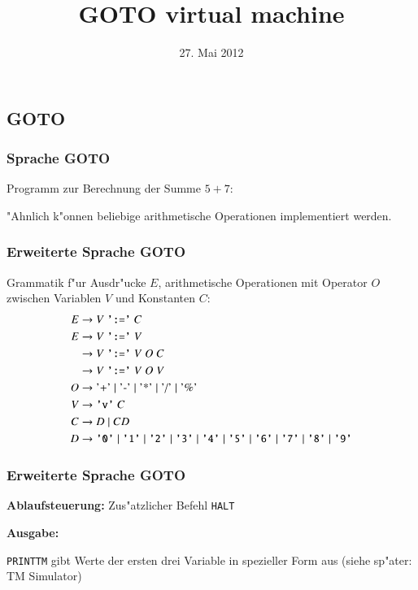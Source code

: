 \documentclass{beamer}
\title[]{GOTO virtual machine}
\date[27. Mai 2012]{27. Mai 2012}
\begin{document}
\def\blank{\text{\textvisiblespace}}

\begin{frame}
\titlepage
\end{frame}

\begin{frame}
\section{GOTO}
\frametitle{Sprache GOTO}
Programm zur Berechnung der Summe $5 + 7$:


"Ahnlich k"onnen beliebige arithmetische Operationen implementiert werden.

\end{frame}

\begin{frame}
\frametitle{Erweiterte Sprache GOTO}
Grammatik f"ur Ausdr"ucke $E$, arithmetische Operationen
mit Operator $O$
zwischen
Variablen $V$ und Konstanten $C$:
\begin{align*}
E&\rightarrow V \; \text{\tt ':='} \; C\\
E&\rightarrow V \; \text{\tt ':='} \; V\\
 &\rightarrow V \; \text{\tt ':='} \; V \; O \; C\\
 &\rightarrow V \; \text{\tt ':='} \; V \; O \; V\\
O&\rightarrow \text{'+'}\;|\; \text{'-'}\;|\; \text{'*'}\;|\; \text{'/'}\;|\; \text{'\%'}\\
V&\rightarrow \text{\tt 'v'}\; C\\
C&\rightarrow D \; |\; CD\\
D&\rightarrow
\text{\tt '0'}\;|\;
\text{\tt '1'}\;|\;
\text{\tt '2'}\;|\;
\text{\tt '3'}\;|\;
\text{\tt '4'}\;|\;
\text{\tt '5'}\;|\;
\text{\tt '6'}\;|\;
\text{\tt '7'}\;|\;
\text{\tt '8'}\;|\;
\text{\tt '9'}
\end{align*}
\end{frame}

\begin{frame}
\frametitle{Erweiterte Sprache GOTO}

{\bf Ablaufsteuerung:} Zus"atzlicher Befehl {\tt HALT}


{\bf Ausgabe:} 


{\tt PRINTTM} gibt Werte der ersten drei Variable in spezieller Form aus
(siehe sp"ater: TM Simulator)

\end{frame}
\end{document}
